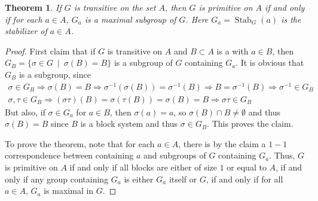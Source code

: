 \documentclass[12pt]{article}
\newtheorem{thm}{Theorem}
\DeclareMathOperator{\Stab}{Stab}
\begin{document}
\begin{thm} If $G$ is transitive on the set $A$, then $G$ is primitive on $A$ if and only if for each $a\in A$, $G_a$ is a maximal subgroup of $G$. Here $G_a=\Stab_G(a)$ is the stabilizer of $a\in A$.
\end{thm}
\begin{proof}
First claim that if $G$ is transitive on $A$ and $B\subset A$ is a  with $a\in B$, then $G_B=\{\sigma\in G\ \mid\ \sigma(B)=B\}$ is a subgroup of $G$ containing $G_a$. It is obvious that $G_B$ is a subgroup, since
\begin{gather*}
\sigma\in G_B\Rightarrow \sigma(B)=B\Rightarrow \sigma^{-1}(\sigma(B))=\sigma^{-1}(B)\Rightarrow B=\sigma^{-1}(B)\Rightarrow \sigma^{-1}\in G_B\\
\sigma,\tau\in G_B \Rightarrow (\sigma\tau)(B)=\sigma(\tau(B))=\sigma(B)=B\Rightarrow \sigma\tau\in G_B
\end{gather*}
But also, if $\sigma\in G_a$ for $a\in B$, then $\sigma(a)=a$, so $\sigma(B)\cap B\neq \emptyset$ and thus $\sigma(B)=B$ since $B$ is a block system and thus $\sigma\in G_B$. This proves the claim.

To prove the theorem, note that for each $a\in A$, there is by the claim a $1-1$ correspondence between  containing $a$ and subgroups of $G$ containing $G_a$. Thus, $G$ is primitive on $A$ if and only if all blocks are either of size $1$ or equal to $A$, if and only if any group containing $G_a$ is either $G_a$ itself or $G$, if and only if for all $a\in A$, $G_a$ is maximal in $G$.
\end{proof}
\end{document}
